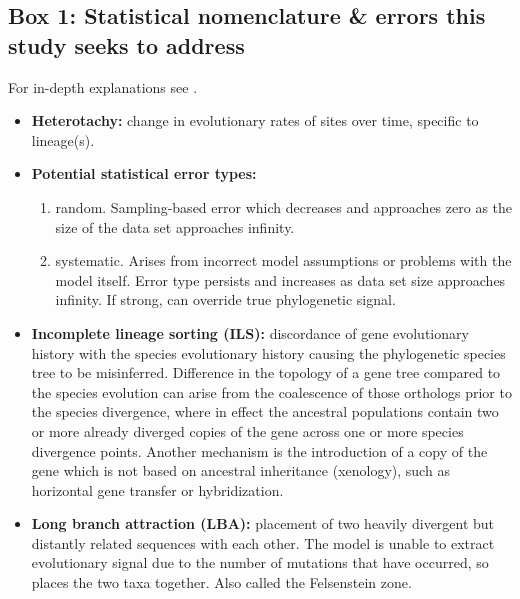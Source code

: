 \documentclass[fleqn,10pt,lineno]{wlpeerj} %
\begin{document}
\subsection*{Box 1: Statistical nomenclature \& errors this study seeks to address}
\label{sec:statbox}
For in-depth explanations see \cite{yang2014molecular}.
\begin{itemize}[noitemsep]
\item \textbf{Heterotachy:} change in evolutionary rates of sites over time, specific to lineage(s).
\item \textbf{Potential statistical error types:}
\begin{enumerate}[noitemsep]
\item random. Sampling-based error which decreases and approaches zero as the size of the data set approaches infinity.\\
\item systematic. Arises from incorrect model assumptions or problems with the model itself. 
Error type persists and increases as data set size approaches infinity. 
If strong, can override true phylogenetic signal.
\end{enumerate}
\item \textbf{Incomplete lineage sorting (ILS):} discordance of gene evolutionary history with the species evolutionary history causing the phylogenetic species tree to be misinferred. 
Difference in the topology of a gene tree compared to the species evolution can arise from the coalescence of those orthologs prior to the species divergence, where in effect the ancestral populations contain two or more already diverged copies of the gene across one or more species divergence points. 
Another mechanism is the introduction of a copy of the gene which is not based on ancestral inheritance (xenology), such as horizontal gene transfer or hybridization.
\item \textbf{Long branch attraction (LBA):} placement of two heavily divergent but distantly related sequences with each other. 
The model is unable to extract evolutionary signal due to the number of mutations that have occurred, so places the two taxa together. 
Also called the Felsenstein zone.
\end{itemize}
\end{document}
